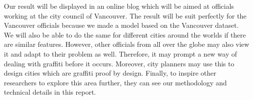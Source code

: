 Our result will be displayed in an online blog which will be aimed at officials working at the city council of Vancouver. The result will be suit perfectly for the Vancouver officials because we made a model based on the Vancouver dataset. We will also be able to do the same for different cities around the worlds if there are similar features. However, other officials from all over the globe may also view it and adapt to their problem as well. Therefore, it may prompt a new way of dealing with graffiti before it occurs. Moreover, city planners may use this to design cities which are graffiti proof by design. Finally, to inspire other researchers to explore this area further, they can see our methodology and technical details in this report.
